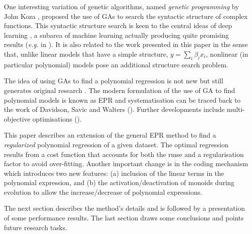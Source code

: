 \documentclass[preprint,authoryear,12pt]{elsarticle}
\begin{document}
One interesting variation of genetic algorithms, named \emph{genetic programming} by John Koza \citep{Koza:1992aa}, proposed the use of \acp{GA} to search the syntactic structure of complex functions. This syntactic structure search is keen to the central ideas of deep learning \citep{Bengio:2009aa,Bengio:2013aa}, a subarea of machine learning actually producing quite promising results (\emph{e.g.} in \cite{Tarlow:2013fk}). It is also related to the work presented in this paper in the sense that, unlike linear models that have a simple structure, $y=\sum_i \beta_i x_i$, nonlinear (in particular polynomial) models pose an additional structure search problem.

The idea of using \acp{GA} to find a polynomial regression is not new \citep{Maertens:2006aa, Yu:2008aa, Wu:2009aa} but still generates original research \citep{Hofwing:2011aa,Cetisli:2011aa}. The modern formulation of the use of \ac{GA} to find polynomial models is known as \acf{EPR} and systematisation can be traced back to the work of Davidson, Savic and Walters (\cite{Davidson:2003aa}). Further developments include multi-objective optimisations (\cite{Giustolisi:2009aa}). 

This paper describes an extension of the general \ac{EPR} method to find a \emph{regularized} polynomial regression of a given dataset. The optimal regression results from a cost function that accounts for both the \ac{rmse} and a regularisation factor to avoid over-fitting. Another important change is in the coding mechanism which introduces two new features: (a) inclusion of the linear terms in the polynomial expression, and (b) the activation/deactivation of monoids during evolution to allow the increase/decrease of polynomial expressions.



The next section describes the method's details and is followed by a presentation of some performance results. The last section draws some conclusions and points future research tasks.
\end{document}
